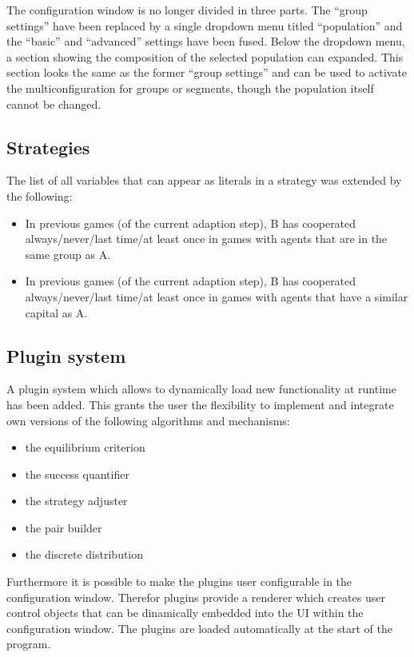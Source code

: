 \documentclass[parskip=full,11pt]{scrartcl}
\begin{document}
The configuration window is no longer divided in three parts. The \enquote{group settings} have been replaced by a single dropdown menu titled \enquote{population} and the \enquote{basic} and \enquote{advanced} settings have been fused. Below the dropdown menu, a section showing the composition of the selected population can expanded. This section looks the same as the former \enquote{group settings} and can be used to activate the multiconfiguration for groups or segments, though the population itself cannot be changed.

\subsection{Strategies}
The list of all variables that can appear as literals in a strategy was extended by the following:
\begin{itemize}
\item In previous games (of the current adaption step), B has cooperated always/never/last time/at least once in games with agents that are in the same group as A.
\item In previous games (of the current adaption step), B has cooperated always/never/last time/at least once in games with agents that have a similar capital as A.
\end{itemize}

\subsection{Plugin system}

A plugin system which allows to dynamically load new functionality at runtime has been added. This grants the user the flexibility to implement and integrate own versions of the following algorithms and mechanisms:
\begin{itemize} \itemsep -10pt
	\item the equilibrium criterion
	\item the success quantifier
	\item the strategy adjuster
	\item the pair builder
	\item the discrete distribution
\end{itemize}

Furthermore it is possible to make the plugins user configurable in the configuration window. Therefor plugins provide a renderer which creates user control objects that can be dinamically embedded into the UI within the configuration window. The plugins are loaded automatically at the start of the program.
\end{document}
